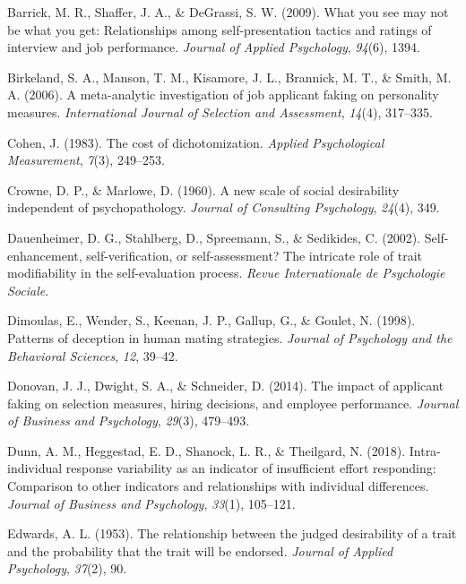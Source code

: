 \documentclass[
  english,
  ,jou]{apa6}
\begin{document}
\leavevmode\hypertarget{ref-barrick_what_2009}{}%
Barrick, M. R., Shaffer, J. A., \& DeGrassi, S. W. (2009). What you see may not be what you get: Relationships among self-presentation tactics and ratings of interview and job performance. \emph{Journal of Applied Psychology}, \emph{94}(6), 1394.

\leavevmode\hypertarget{ref-birkeland_meta-analytic_2006}{}%
Birkeland, S. A., Manson, T. M., Kisamore, J. L., Brannick, M. T., \& Smith, M. A. (2006). A meta-analytic investigation of job applicant faking on personality measures. \emph{International Journal of Selection and Assessment}, \emph{14}(4), 317--335.

\leavevmode\hypertarget{ref-cohen_cost_1983}{}%
Cohen, J. (1983). The cost of dichotomization. \emph{Applied Psychological Measurement}, \emph{7}(3), 249--253.

\leavevmode\hypertarget{ref-crowne_new_1960}{}%
Crowne, D. P., \& Marlowe, D. (1960). A new scale of social desirability independent of psychopathology. \emph{Journal of Consulting Psychology}, \emph{24}(4), 349.

\leavevmode\hypertarget{ref-dauenheimer_self-enhancement_2002}{}%
Dauenheimer, D. G., Stahlberg, D., Spreemann, S., \& Sedikides, C. (2002). Self-enhancement, self-verification, or self-assessment? The intricate role of trait modifiability in the self-evaluation process. \emph{Revue Internationale de Psychologie Sociale}.

\leavevmode\hypertarget{ref-dimoulas_patterns_1998}{}%
Dimoulas, E., Wender, S., Keenan, J. P., Gallup, G., \& Goulet, N. (1998). Patterns of deception in human mating strategies. \emph{Journal of Psychology and the Behavioral Sciences}, \emph{12}, 39--42.

\leavevmode\hypertarget{ref-donovan_impact_2014}{}%
Donovan, J. J., Dwight, S. A., \& Schneider, D. (2014). The impact of applicant faking on selection measures, hiring decisions, and employee performance. \emph{Journal of Business and Psychology}, \emph{29}(3), 479--493.

\leavevmode\hypertarget{ref-dunn_intra-individual_2018}{}%
Dunn, A. M., Heggestad, E. D., Shanock, L. R., \& Theilgard, N. (2018). Intra-individual response variability as an indicator of insufficient effort responding: Comparison to other indicators and relationships with individual differences. \emph{Journal of Business and Psychology}, \emph{33}(1), 105--121.

\leavevmode\hypertarget{ref-edwards_relationship_1953}{}%
Edwards, A. L. (1953). The relationship between the judged desirability of a trait and the probability that the trait will be endorsed. \emph{Journal of Applied Psychology}, \emph{37}(2), 90.
\end{document}
